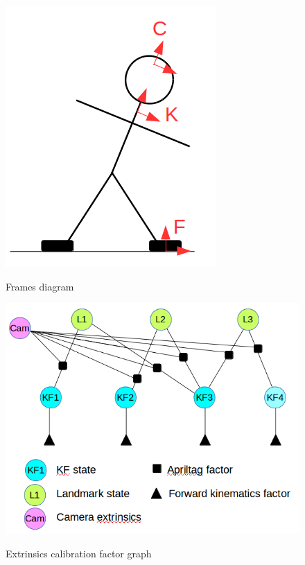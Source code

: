 \documentclass[11pt]{article}
\begin{document}
\begin{figure}[ht]
\begin{minipage}[c]{.46\linewidth}
    \centering
    \includegraphics[width=0.6\linewidth]{img/robot_sketch.png}
    \label{fig:sketch}
    \caption{Frames diagram}
\end{minipage} \hfill
\begin{minipage}[c]{.46\linewidth}
    \centering
    \includegraphics[width=\linewidth]{img/cam_extrinsics_factor_graph.png}
    \label{fig:factorgraph}
    \caption{Extrinsics calibration factor graph}
\end{minipage}
\end{figure}
\end{document}
